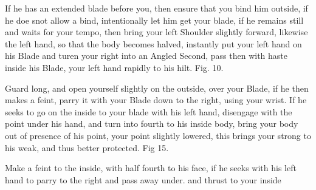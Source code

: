 \exercise{}
If he has an extended blade before you, then ensure that you bind him
outside, if he doe snot allow a bind, intentionally let him get your
blade, if he remains still and waits for your tempo, then bring your
left Shoulder slightly forward, likewise the left hand, so that the
body becomes halved, instantly put your
left hand on his Blade and turen your right into an Angled Second,
pass then with haste inside his Blade, your left hand rapidly to his
hilt. Fig. 10.


Guard long, and open yourself slightly on the outside, over your
Blade, if he then makes a feint, parry it with your Blade down to the
right, using your wrist. If he seeks to go on the inside to your blade
with his left hand, disengage with the point under his hand, and turn
into fourth to his inside body, bring your body out of presence of his
point, your point slightly lowered, this brings your strong to his
weak, and thus better protected. Fig 15.


\exercise{}

Make a feint to the inside, with half fourth to his face, if he seeks with his left hand to parry to the right and pass away under. and thrust to your inside
